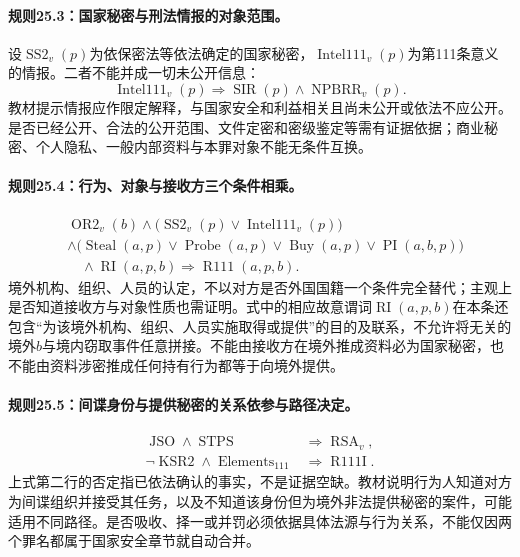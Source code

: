 \paragraph{规则25.3：国家秘密与刑法情报的对象范围。}
设$\operatorname{SS2}_v(p)$为依保密法等依法确定的国家秘密，$\operatorname{Intel111}_v(p)$为第111条意义的情报。二者不能并成一切未公开信息：
\[
\operatorname{Intel111}_v(p)\Rightarrow
\operatorname{SIR}(p)
\land\operatorname{NPBRR}_v(p).
\]
教材提示情报应作限定解释，与国家安全和利益相关且尚未公开或依法不应公开。是否已经公开、合法的公开范围、文件定密和密级鉴定等需有证据依据；商业秘密、个人隐私、一般内部资料与本罪对象不能无条件互换。

\paragraph{规则25.4：行为、对象与接收方三个条件相乘。}
\[
\begin{aligned}
&\operatorname{OR2}_v(b)\land
\bigl(\operatorname{SS2}_v(p)\lor\operatorname{Intel111}_v(p)\bigr)\\
&\land\bigl(\operatorname{Steal}(a,p)\lor\operatorname{Probe}(a,p)
\lor\operatorname{Buy}(a,p)\lor\operatorname{PI}(a,b,p)\bigr)\\
&\quad\land\operatorname{RI}(a,p,b)
\Rightarrow\operatorname{R111}(a,p,b).
\end{aligned}
\]
境外机构、组织、人员的认定，不以对方是否外国国籍一个条件完全替代；主观上是否知道接收方与对象性质也需证明。式中的相应故意谓词$\operatorname{RI}(a,p,b)$在本条还包含“为该境外机构、组织、人员实施取得或提供”的目的及联系，不允许将无关的境外$b$与境内窃取事件任意拼接。不能由接收方在境外推成资料必为国家秘密，也不能由资料涉密推成任何持有行为都等于向境外提供。

\paragraph{规则25.5：间谍身份与提供秘密的关系依参与路径决定。}
\[
\begin{aligned}
\operatorname{JSO}\land\operatorname{STPS}
&\Rightarrow\operatorname{RSA}_v,\\
\neg\operatorname{KSR2}\land\operatorname{Elements}_{111}
&\Rightarrow\operatorname{R111I}.
\end{aligned}
\]
上式第二行的否定指已依法确认的事实，不是证据空缺。教材说明行为人知道对方为间谍组织并接受其任务，以及不知道该身份但为境外非法提供秘密的案件，可能适用不同路径。是否吸收、择一或并罚必须依据具体法源与行为关系，不能仅因两个罪名都属于国家安全章节就自动合并。

